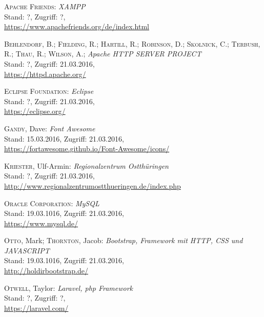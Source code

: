 

\begin{thebibliography}{999}

 \textsc{Apache Friends}: \textit{XAMPP}\\
			{\small Stand: ?, Zugriff: ?,} \\
			\url{https://www.apachefriends.org/de/index.html}
			
 \textsc{Behlendorf}, B.; \textsc{Fielding}, R.; \textsc{Hartill}, R.; \textsc{Robinson}, D.; \textsc{Skolnick}, C.; \textsc{Terbush}, R.; \textsc{Thau}, R.; \textsc{Wilson}, A.; \textit{Apache HTTP SERVER PROJECT}\\
			{\small Stand: ?, Zugriff: 21.03.2016,} \\
			\url{https://httpd.apache.org/}
			
 \textsc{Eclipse Foundation}: \textit{Eclipse}\\
			{\small Stand: ?, Zugriff: 21.03.2016,} \\
			\url{https://eclipse.org/}

 \textsc{Gandy}, Dave: \textit{Font Awesome}\\
			{\small Stand: 15.03.2016, Zugriff: 21.03.2016,} \\
			\url{https://fortawesome.github.io/Font-Awesome/icons/}
			
 \textsc{Kriester}, Ulf-Armin: \textit{Regionalzentrum Ostthüringen}\\
			{\small Stand: ?, Zugriff: 21.03.2016,} \\
			\url{http://www.regionalzentrumostthueringen.de/index.php}
			
 \textsc{Oracle Corporation}: \textit{MySQL}\\
			{\small Stand: 19.03.1016, Zugriff: 21.03.2016,}\\
			\url{https://www.mysql.de/}

 \textsc{Otto}, Mark; \textsc{Thornton}, Jacob: \textit{Bootstrap, Framework mit HTTP, CSS und JAVASCRIPT}\\
			{\small Stand: 19.03.1016, Zugriff: 21.03.2016,}\\
			\url{http://holdirbootstrap.de/}
			
 \textsc{Otwell}, Taylor: \textit{Laravel, php Framework}\\
			{\small Stand: ?, Zugriff: ?,} \\
			\url{https://laravel.com/}


\end{thebibliography}

